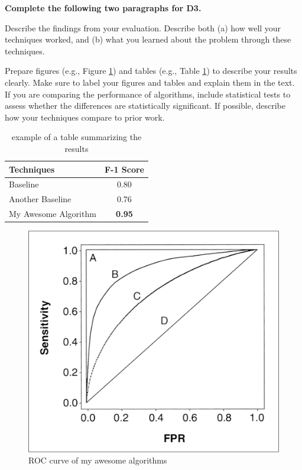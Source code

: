 \documentclass[letterpaper]{article} %
\begin{document}




{\bf Complete the following two paragraphs for D3.}

Describe the findings from your evaluation.  Describe both (a) how well your techniques worked, and (b) what you learned about the problem through these techniques.  

Prepare figures (e.g., Figure \ref{fig:results2}) and tables (e.g., Table \ref{tab:results1}) to describe your results clearly.  Make sure to label your figures and tables and explain them in the text.  If you are comparing the performance of algorithms, include statistical tests to assess whether the differences are statistically significant.  If possible, describe how your techniques compare to prior work.  

\begin{table}[h!]
    \centering
    \normalsize{
    \begin{tabular}{ l c }
    \hline
         Techniques & F-1 Score\\
         \hline
          Baseline & 0.80 \\
          Another Baseline & 0.76\\
          My Awesome Algorithm & {\bf 0.95}\\
         \hline
    \end{tabular}}
    \caption{example of a table summarizing the results}
    \label{tab:results1}
\end{table} 

\begin{figure}[htbp!]
  \centering
  \includegraphics[width=0.9\linewidth]{figures/roc.png}
  \caption{ROC curve of my awesome algorithms}
  \label{fig:results2}
\end{figure}
\end{document}
